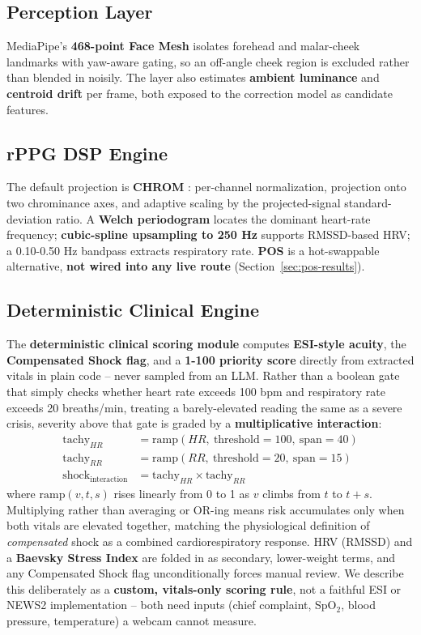 \documentclass[conference]{IEEEtran}
\begin{document}
\subsection{\textbf{Perception Layer}}
MediaPipe's \cite{b_mediapipe} \textbf{468-point Face Mesh} isolates forehead and malar-cheek landmarks with yaw-aware gating, so an off-angle cheek region is excluded rather than blended in noisily. The layer also estimates \textbf{ambient luminance} and \textbf{centroid drift} per frame, both exposed to the correction model as candidate features.

\subsection{\textbf{rPPG DSP Engine}}
The default projection is \textbf{CHROM} \cite{b_chrom}: per-channel normalization, projection onto two chrominance axes, and adaptive scaling by the projected-signal standard-deviation ratio. A \textbf{Welch periodogram} locates the dominant heart-rate frequency; \textbf{cubic-spline upsampling to 250 Hz} supports RMSSD-based HRV; a 0.10-0.50 Hz bandpass extracts respiratory rate. \textbf{POS} \cite{b_pos_principles} is a hot-swappable alternative, \textbf{not wired into any live route} (Section~\ref{sec:pos-results}).

\subsection{\textbf{Deterministic Clinical Engine}}
\label{sec:clinical-engine}
The \textbf{deterministic clinical scoring module} computes \textbf{ESI-style acuity}, the \textbf{Compensated Shock flag}, and a \textbf{1-100 priority score} directly from extracted vitals in plain code -- never sampled from an LLM. Rather than a boolean gate that simply checks whether heart rate exceeds 100 bpm and respiratory rate exceeds 20 breaths/min, treating a barely-elevated reading the same as a severe crisis, severity above that gate is graded by a \textbf{multiplicative interaction}:
\begin{align}
\text{tachy}_{HR} &= \text{ramp}(HR,\ \text{threshold}=100,\ \text{span}=40) \\
\text{tachy}_{RR} &= \text{ramp}(RR,\ \text{threshold}=20,\ \text{span}=15) \\
\text{shock}_{\text{interaction}} &= \text{tachy}_{HR} \times \text{tachy}_{RR}
\end{align}
where $\text{ramp}(v, t, s)$ rises linearly from 0 to 1 as $v$ climbs from $t$ to $t+s$. Multiplying rather than averaging or OR-ing means risk accumulates only when both vitals are elevated together, matching the physiological definition of \emph{compensated} shock as a combined cardiorespiratory response. HRV (RMSSD) and a \textbf{Baevsky Stress Index} are folded in as secondary, lower-weight terms, and any Compensated Shock flag unconditionally forces manual review. We describe this deliberately as a \textbf{custom, vitals-only scoring rule}, not a faithful ESI \cite{b_esi} or NEWS2 \cite{b_news2} implementation -- both need inputs (chief complaint, SpO$_2$, blood pressure, temperature) a webcam cannot measure.
\end{document}
